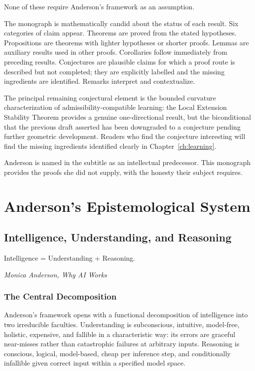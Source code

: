 \documentclass[12pt, a4paper, oneside]{book}
\begin{document}
None of these require Anderson's framework as an assumption.

The monograph is mathematically candid about the status of each result.
Six categories of claim appear. Theorems are proved from the stated
hypotheses. Propositions are theorems with lighter hypotheses or shorter
proofs. Lemmas are auxiliary results used in other proofs. Corollaries
follow immediately from preceding results. Conjectures are plausible
claims for which a proof route is described but not completed; they are
explicitly labelled and the missing ingredients are identified. Remarks
interpret and contextualize.

The principal remaining conjectural element is the bounded curvature
characterization of admissibility-compatible learning: the Local
Extension Stability Theorem provides a genuine one-directional result,
but the biconditional that the previous draft asserted has been
downgraded to a conjecture pending further geometric development.
Readers who find the conjecture interesting will find the missing
ingredients identified clearly in Chapter~\ref{ch:learning}.

Anderson is named in the subtitle as an intellectual predecessor. This
monograph provides the proofs she did not supply, with the honesty
their subject requires.

\clearpage

\part{Anderson's Epistemological System}

\chapter{Intelligence, Understanding, and Reasoning}
\label{ch:intelligence}

\epigraph{%
  Intelligence = Understanding + Reasoning.%
}{\textit{Monica Anderson, \emph{Why AI Works}}}

\section{The Central Decomposition}

Anderson's framework opens with a functional decomposition of
intelligence into two irreducible faculties. Understanding is
subconscious, intuitive, model-free, holistic, expensive, and fallible
in a characteristic way: its errors are graceful near-misses rather than
catastrophic failures at arbitrary inputs. Reasoning is conscious,
logical, model-based, cheap per inference step, and conditionally
infallible given correct input within a specified model space.
\end{document}
